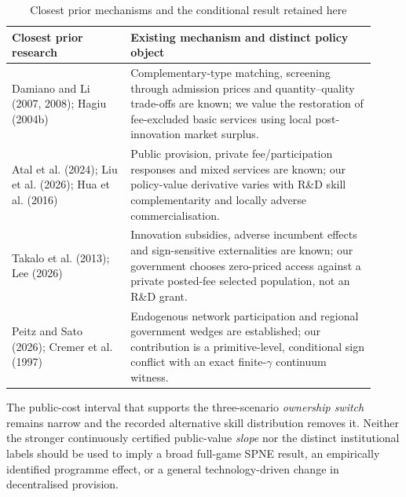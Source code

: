 \begin{table}[htbp]\centering\small
\caption{Closest prior mechanisms and the conditional result retained here}\label{tab:prior}
\begin{tabular}{@{}>{\raggedright\arraybackslash}p{0.30\linewidth}>{\raggedright\arraybackslash}p{0.62\linewidth}@{}}\toprule
Closest prior research & Existing mechanism and distinct policy object\\\midrule
Damiano and Li (2007, 2008); Hagiu (2004b) &
Complementary-type matching, screening through admission prices and quantity--quality trade-offs are known; we value the restoration of fee-excluded basic services using local post-innovation market surplus.\\\addlinespace[3pt]
Atal et al. (2024); Liu et al. (2026); Hua et al. (2016) &
Public provision, private fee/participation responses and mixed services are known; our policy-value derivative varies with R\&D skill complementarity and locally adverse commercialisation.\\\addlinespace[3pt]
Takalo et al. (2013); Lee (2026) &
Innovation subsidies, adverse incumbent effects and sign-sensitive externalities are known; our government chooses zero-priced access against a private posted-fee selected population, not an R\&D grant.\\\addlinespace[3pt]
Peitz and Sato (2026); Cremer et al. (1997) &
Endogenous network participation and regional government wedges are established; our contribution is a primitive-level, conditional sign conflict with an exact finite-$\gamma$ continuum witness.\\\bottomrule
\end{tabular}
\end{table}

The public-cost interval that supports the three-scenario \emph{ownership switch} remains narrow and the recorded alternative skill distribution removes it. Neither the stronger continuously certified public-value \emph{slope} nor the distinct institutional labels should be used to imply a broad full-game SPNE result, an empirically identified programme effect, or a general technology-driven change in decentralised provision.